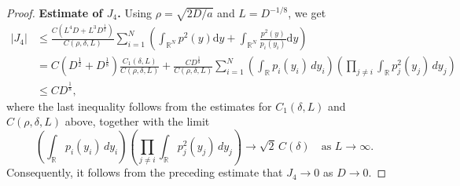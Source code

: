 \documentclass[12pt,reqno]{amsart}
\numberwithin{equation}{section}
\begin{document}
\begin{proof}
\textbf{Estimate of $J_4$.}
Using $\rho=\sqrt{2D/a}$ and $L=D^{-1/8}$, we get
\begin{align*}
    |J_4|    
&\le \frac{C(L^4 D + L^3 D^{\frac{1}{2}}) }{C(\rho,\delta,L)}\sum_{i=1}^N \left(\int_{\mathbb{R}^N}p^2(y)\mathrm{d}y+\int_{\mathbb{R}^N}\frac{p^2(y)}{p_i(y_i)}\mathrm{d}y\right)\nonumber\\
&= C (D^\frac{1}{2} + D^\frac{1}{8}) \frac{C_1(\delta,L)}{C(\rho,\delta,L)} 
 + \frac{C D^\frac{1}{8}}{C(\rho,\delta,L)} \sum_{i=1}^N \left( \int_{\mathbb{R}} p_i(y_i) \, dy_i \right) \left( \prod_{j \neq i} \int_{\mathbb{R}} p_j^2(y_j) \, dy_j \right) \nonumber\\
&\le C D^\frac{1}{8},
\end{align*}
where the last inequality follows from the estimates for $C_1(\delta,L)$ and $C(\rho,\delta,L)$ above, together with the limit
\[
\left( \int_{\mathbb{R}} p_i(y_i) \, dy_i \right) \left( \prod_{j \neq i} \int_{\mathbb{R}} p_j^2(y_j) \, dy_j \right) \to \sqrt{2} \, C(\delta) \quad \text{as } L \to \infty.
\]
Consequently, it follows from the preceding estimate that $J_4\to 0$ as $D\to 0$.


\end{proof}
\end{document}
